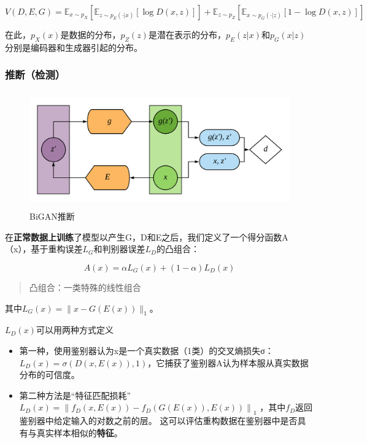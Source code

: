 \documentclass[12pt]{article}
\begin{document}
\[V(D, E, G)=\mathbb{E}_{x \sim p_{X}}\left[\mathbb{E}_{z \sim p_{E}(\cdot | x)}[\log D(x, z)]\right]+\mathbb{E}_{z \sim p_{Z}}\left[\mathbb{E}_{x \sim p_{G}(\cdot | z)}[1-\log D(x, z)]\right]\]

在此，\(p_{X}(x)\)是数据的分布，\(p_{Z}(z)\)是潜在表示的分布，\(p_{E}(z | x)\)和\(p_{G}(x | z)\)分别是编码器和生成器引起的分布。

\subsubsection{推断（检测）}\label{header-n21}

\begin{figure}[htbp]
\centering
\includegraphics[height=5cm,width=12cm]{Report2-figure/image-20191001150021322.png}
\caption{BiGAN推断}
\end{figure}

在\textbf{正常数据上训练}了模型以产生G，D和E之后，我们定义了一个得分函数A（x），基于重构误差\(L_G\)和判别器误差\(L_D\)的凸组合：

\[A(x)=\alpha L_{G}(x)+(1-\alpha) L_{D}(x)\]

\begin{quote}
凸组合：一类特殊的线性组合
\end{quote}

其中\(L_{G}(x)=\|x-G(E(x))\|_{1}\)。

\(L_{D}(x)\)可以用两种方式定义

\begin{itemize}
\item
  第一种，使用鉴别器认为x是一个真实数据（1类）的交叉熵损失σ：\(L_D(x) = \sigma(D(x, E(x)), 1)\)，它捕获了鉴别器A认为样本服从真实数据分布的可信度。
\item
  第二种方法是``特征匹配损耗''\(L_D(x)=\left\|f_{D}(x, E(x))-f_{D}(G(E(x)), E(x))\right\|_{1}\)
  ，其中\(f_D\)返回鉴别器中给定输入的对数之前的层。
  这可以评估重构数据在鉴别器中是否具有与真实样本相似的\textbf{特征}。 
\end{itemize}
\end{document}
